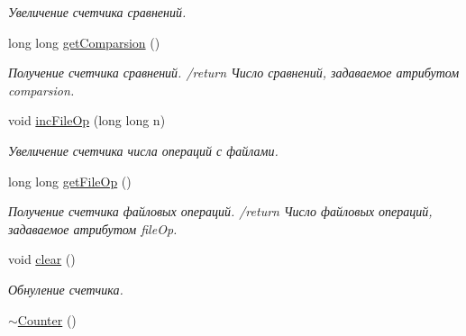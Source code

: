 \begin{DoxyCompactItemize}
\begin{DoxyCompactList}\small\item\em Увеличение счетчика сравнений. \end{DoxyCompactList}\item 
long long \hyperlink{class_counter_a273aaa4592ef5fae6b7a90544d0ff6e0}{get\+Comparsion} ()
\begin{DoxyCompactList}\small\item\em Получение счетчика сравнений. /return Число сравнений, задаваемое атрибутом comparsion. \end{DoxyCompactList}\item 
void \hyperlink{class_counter_a63310182709c321ad8fe8e78b81d12aa}{inc\+File\+Op} (long long n)
\begin{DoxyCompactList}\small\item\em Увеличение счетчика числа операций с файлами. \end{DoxyCompactList}\item 
long long \hyperlink{class_counter_ac0a53b0296d0eacca2a2391a12ae39c5}{get\+File\+Op} ()
\begin{DoxyCompactList}\small\item\em Получение счетчика файловых операций. /return Число файловых операций, задаваемое атрибутом file\+Op. \end{DoxyCompactList}\item 
void \hyperlink{class_counter_af66c74ac2bc69fa4f30c34377f869596}{clear} ()
\begin{DoxyCompactList}\small\item\em Обнуление счетчика. \end{DoxyCompactList}\item 
\hyperlink{class_counter_a97f4728470ae8eff37d50ef1d6bb0135}{$\sim$\+Counter} ()
\end{DoxyCompactItemize}
